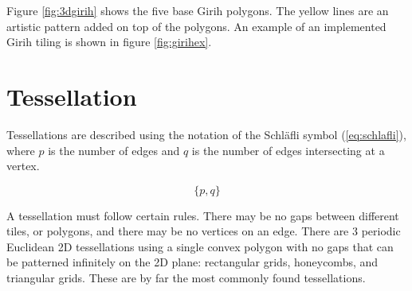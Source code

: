 \documentclass[12pt,letterpaper]{article}
\begin{document}
Figure \ref{fig:3dgirih} shows the five base Girih polygons. The yellow lines are an artistic pattern added on top of the polygons. An example of an implemented Girih tiling is shown in figure \ref{fig:girihex}.

\section{Tessellation}
Tessellations are described using the notation of the Schl\"afli symbol (\ref{eq:schlafli}), where $p$ is the number of edges and $q$ is the number of edges intersecting at a vertex.

\begin{equation}
    \label{eq:schlafli}
    \{p,q\}
\end{equation}

A tessellation must follow certain rules. There may be no gaps between different tiles, or polygons, and there may be no vertices on an edge. There are 3 periodic Euclidean 2D tessellations using a single convex polygon with no gaps that can be patterned infinitely on the 2D plane: rectangular grids, honeycombs, and triangular grids. These are by far the most commonly found tessellations.
\end{document}
